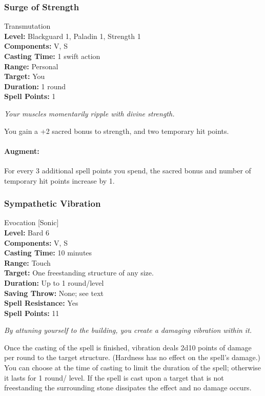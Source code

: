 \subsubsection{Surge of Strength}
\label{Spell:SurgeOfStrength}
Transmutation
\\ \textbf{Level:} Blackguard 1, Paladin 1, Strength 1
\\ \textbf{Components:} V, S
\\ \textbf{Casting Time:} 1 swift action
\\ \textbf{Range:} Personal
\\ \textbf{Target:} You
\\ \textbf{Duration:} 1 round
\\ \textbf{Spell Points:} 1

\emph{Your muscles momentarily ripple with divine strength.}

You gain a +2 sacred bonus to strength, and two temporary hit points.

\paragraph{Augment:} For every 3 additional spell points you spend, the sacred bonus and number of temporary hit points increase by 1.

\subsubsection{Sympathetic Vibration}
\label{Spell:SympatheticVibration}
Evocation [Sonic]
\\ \textbf{Level:} Bard 6
\\ \textbf{Components:} V, S
\\ \textbf{Casting Time:} 10 minutes
\\ \textbf{Range:} Touch
\\ \textbf{Target:} One freestanding structure of any size.
\\ \textbf{Duration:} Up to 1 round/level
\\ \textbf{Saving Throw:} None; see text
\\ \textbf{Spell Resistance:} Yes
\\ \textbf{Spell Points:} 11

\emph{By attuning yourself to the building, you create a damaging vibration within it.} 

Once the casting of the spell is finished, vibration deals 2d10 points of damage per round to the target structure. (Hardness has no effect on the spell's damage.) You can choose at the time of casting to limit the duration of the spell; otherwise it lasts for 1 round/ level. If the spell is cast upon a target that is not freestanding the surrounding stone dissipates the effect and no damage occurs.

